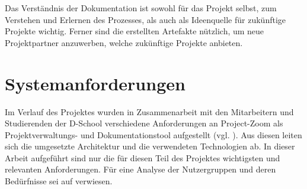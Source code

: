 Das Verständnis der Dokumentation ist sowohl für das Projekt selbst, zum Verstehen und Erlernen des Prozesses, als auch als Ideenquelle für zukünftige Projekte wichtig. Ferner sind die erstellten Artefakte nützlich, um neue Projektpartner anzuwerben, welche zukünftige Projekte anbieten. 

\section{Systemanforderungen}
\label{sec:requirements}

Im Verlauf des Projektes wurden in Zusammenarbeit mit den Mitarbeitern und Studierenden der D-School verschiedene Anforderungen an Project-Zoom als Projektverwaltungs- und Dokumentationstool aufgestellt (vgl. \cite{requirements}).  Aus diesen leiten sich die umgesetzte Architektur und die verwendeten Technologien ab. In dieser Arbeit aufgeführt sind nur die für diesen Teil des Projektes wichtigsten und relevanten Anforderungen. Für eine Analyse der Nutzergruppen und deren Bedürfnisse sei auf \cite{requirements}  verwiesen.

